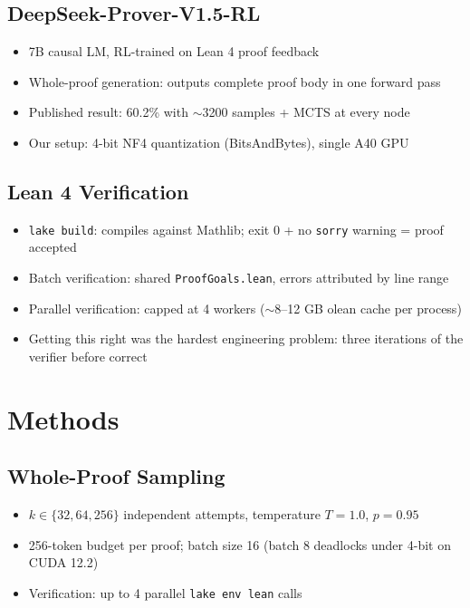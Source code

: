 \documentclass[openany, amssymb, psamsfonts]{amsart}
\begin{document}
\subsection{DeepSeek-Prover-V1.5-RL}
\begin{itemize}
  \item 7B causal LM, RL-trained on Lean 4 proof feedback
  \item Whole-proof generation: outputs complete proof body in one forward pass
  \item Published result: 60.2\% with $\sim$3200 samples + MCTS at every node
  \item Our setup: 4-bit NF4 quantization (BitsAndBytes), single A40 GPU
\end{itemize}

\subsection{Lean 4 Verification}
\begin{itemize}
  \item \texttt{lake build}: compiles against Mathlib; exit 0 + no \texttt{sorry} warning = proof accepted
  \item Batch verification: shared \texttt{ProofGoals.lean}, errors attributed by line range
  \item Parallel verification: capped at 4 workers ($\sim$8--12 GB olean cache per process)
  \item Getting this right was the hardest engineering problem: three iterations of the verifier before correct
\end{itemize}

\section{Methods}

\subsection{Whole-Proof Sampling}
\begin{itemize}
  \item $k \in \{32, 64, 256\}$ independent attempts, temperature $T=1.0$, $p=0.95$
  \item 256-token budget per proof; batch size 16 (batch 8 deadlocks under 4-bit on CUDA 12.2)
  \item Verification: up to 4 parallel \texttt{lake env lean} calls
\end{itemize}
\end{document}
